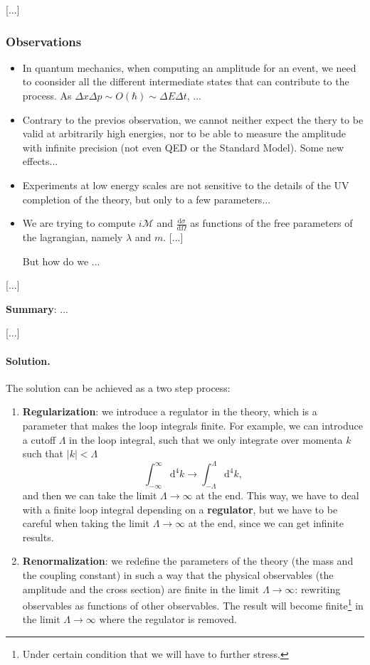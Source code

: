     [...]

\subsubsection{Observations}

\begin{itemize}
    \item In quantum mechanics, when computing an amplitude for an event, we need to coonsider all the different intermediate states that can contribute to the process. As \(\Delta x \Delta p \sim O(\hbar) \sim \Delta E \Delta t\), ...
    \item Contrary to the previos observation, we cannot neither expect the thery to be valid at arbitrarily high energies, nor to be able to measure the amplitude with infinite precision (not even QED or the Standard Model). Some new effects...
    \item Experiments at low energy scales are not sensitive to the details of the UV completion of the theory, but only to a few parameters...
    \item We are trying to compute \(i \mathcal{M} \) and \(\frac{\mathrm{d} \sigma}{\mathrm{d} \Omega}\) as functions of the free parameters of the lagrangian, namely \(\lambda\) and \(m\). [...]

          But how do we ...
\end{itemize}

[...]

\textbf{Summary}: ...

    [...]

\paragraph{Solution.} The solution can be achieved as a two step process:
\begin{enumerate}
    \item \textbf{Regularization}: we introduce a regulator in the theory, which is a parameter that makes the loop integrals finite. For example, we can introduce a cutoff \(\Lambda\) in the loop integral, such that we only integrate over momenta \(k\) such that \(\vert k \vert < \Lambda\)
          \[
              \int_{-\infty}^{\infty} \mathrm{d}^4 k \to \int_{-\Lambda}^{\Lambda} \mathrm{d}^4 k,
          \]
          and then we can take the limit \(\Lambda \to \infty\) at the end. This way, we have to deal with a finite loop integral depending on a \textbf{regulator}, but we have to be careful when taking the limit \(\Lambda \to \infty\) at the end, since we can get infinite results.
    \item \textbf{Renormalization}: we redefine the parameters of the theory (the mass and the coupling constant) in such a way that the physical observables (the amplitude and the cross section) are finite in the limit \(\Lambda \to \infty\): rewriting observables as functions of other observables. The result will become finite\footnote{Under certain condition that we will have to further stress.} in the limit \(\Lambda \to \infty\) where the regulator is removed.
\end{enumerate}

